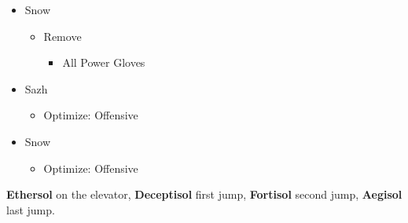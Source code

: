 \documentclass{report}
\begin{document}
\begin{menu}
\begin{itemize}
\begin{itemize}
        \item Snow
        \begin{itemize}
            \item Remove
            \begin{itemize}
                \item All Power Gloves
            \end{itemize}
        \end{itemize}
        \item Sazh
        \begin{itemize}
            \item Optimize: Offensive
        \end{itemize}
        \item Snow
        \begin{itemize}
            \item Optimize: Offensive
        \end{itemize}
    \end{itemize}
\end{itemize}
\end{menu}
\textbf{Ethersol} on the elevator, \textbf{Deceptisol} first jump, \textbf{Fortisol} second jump, \textbf{Aegisol} last jump.
\renewcommand{\first}{[1] Tireless Charge (\com/\com/\med)}
\renewcommand{\second}{[2] Cerberus (\com/\com/\com)}
\renewcommand{\third}{[3] Thaumaturgy (\rav/\rav/\med)}
\renewcommand{\fourth}{[4] Relentless Assault (\com/\rav/\rav)}
\renewcommand{\fifth}{[5] Smart Bomb (\rav/\rav/\sab)}
\renewcommand{\sixth}{[6] Tri-Disaster (\rav/\rav/\rav)}
\end{document}
